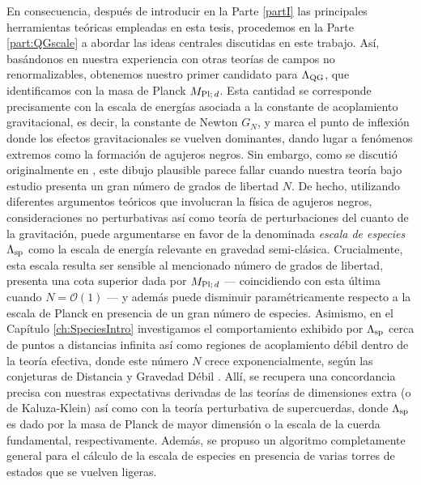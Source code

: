 En consecuencia, después de introducir en la Parte \ref{partI} las principales herramientas teóricas empleadas en esta tesis, procedemos en la Parte \ref{part:QGscale} a abordar las ideas centrales discutidas en este trabajo. Así, basándonos en nuestra experiencia con otras teorías de campos no renormalizables, obtenemos nuestro primer candidato para $\Lambda_{\text{QG}}$, que identificamos con la masa de Planck $M_{\text{Pl;}\, d}$. Esta cantidad se corresponde precisamente con la escala de energías asociada a la constante de acoplamiento gravitacional, es decir, la constante de Newton $G_N$, y marca el punto de inflexión donde los efectos gravitacionales se vuelven dominantes, dando lugar a fenómenos extremos como la formación de agujeros negros. Sin embargo, como se discutió originalmente en \cite{Han:2004wt, Dvali:2007hz, Dvali:2007wp}, este dibujo plausible parece fallar cuando nuestra teoría bajo estudio presenta un gran número de grados de libertad $N$. De hecho, utilizando diferentes argumentos teóricos que involucran la física de agujeros negros, consideraciones no perturbativas así como teoría de perturbaciones del cuanto de la gravitación, puede argumentarse en favor de la denominada \emph{escala de especies} $\Lambda_{\text{sp}}$ como la escala de energía relevante en gravedad semi-clásica. Crucialmente, esta escala resulta ser sensible al mencionado número de grados de libertad, presenta una cota superior dada por $M_{\text{Pl;}\, d}$ --- coincidiendo con esta última cuando $N= \mathcal{O}(1)$ --- y además puede disminuir paramétricamente respecto a la escala de Planck en presencia de un gran número de especies. Asimismo, en el Capítulo \ref{ch:SpeciesIntro} investigamos el comportamiento exhibido por $\Lambda_{\text{sp}}$ cerca de puntos a distancias infinita así como regiones de acoplamiento débil dentro de la teoría efectiva, donde este número $N$ crece exponencialmente, según las conjeturas de Distancia \cite{Ooguri:2006in} y Gravedad Débil \cite{Heidenreich:2015nta, Heidenreich:2016aqi, Montero:2016tif, Andriolo:2018lvp}. Allí, se recupera una concordancia precisa con nuestras expectativas derivadas de las teorías de dimensiones extra (o de Kaluza-Klein) así como con la teoría perturbativa de supercuerdas, donde $\Lambda_{\text{sp}}$ es dado por la masa de Planck de mayor dimensión o la escala de la cuerda fundamental, respectivamente. Además, se propuso un algoritmo completamente general para el cálculo de la escala de especies en presencia de varias torres de estados que se vuelven ligeras.

